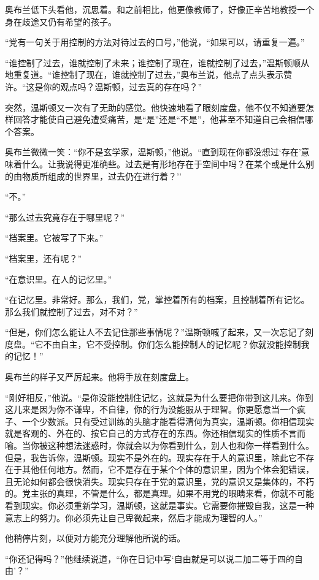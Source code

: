 奥布兰低下头看他，沉思着。和之前相比，他更像教师了，好像正辛苦地教授一个身在歧途又仍有希望的孩子。

``党有一句关于用控制的方法对待过去的口号，''他说，``如果可以，请重复一遍。''

``谁控制了过去，谁就控制了未来；谁控制了现在，谁就控制了过去，''温斯顿顺从地重复道。``谁控制了现在，谁就控制了过去，''奥布兰说，他点了点头表示赞许。``这是你的观点吗？温斯顿，过去真的存在吗？''

突然，温斯顿又一次有了无助的感觉。他快速地看了眼刻度盘，他不仅不知道要怎样回答才能使自己避免遭受痛苦，是``是''还是``不是''，他甚至不知道自己会相信哪个答案。

奥布兰微微一笑：``你不是玄学家，温斯顿，''他说。``直到现在你都没想过`存在'意味着什么。让我说得更准确些。过去是有形地存在于空间中吗？在某个或是什么别的由物质所组成的世界里，过去仍在进行着？''

``不。''

``那么过去究竟存在于哪里呢？''

``档案里。它被写了下来。''

``档案里，还有呢？''

``在意识里。在人的记忆里。''

``在记忆里。非常好。那么，我们，党，掌控着所有的档案，且控制着所有记忆。那么我们就控制了过去，对不对？''

``但是，你们怎么能让人不去记住那些事情呢？''温斯顿喊了起来，又一次忘记了刻度盘。``它不由自主，它不受控制。你们怎么能控制人的记忆呢？你就没能控制我的记忆！''

奥布兰的样子又严厉起来。他将手放在刻度盘上。

``刚好相反，''他说。``是你没能控制住记忆，这就是为什么要把你带到这儿来。你到这儿来是因为你不谦卑，不自律，你的行为没能服从于理智。你更愿意当一个疯子、一个少数派。只有受过训练的头脑才能看得清何为真实，温斯顿。你相信现实就是客观的、外在的、按它自己的方式存在的东西。你还相信现实的性质不言而喻。当你被这种想法迷惑时，你就会以为你看到什么，别人也和你一样看到什么。但是，我告诉你，温斯顿。现实不是外在的。现实存在于人的意识里，除此它不存在于其他任何地方。然而，它不是存在于某个个体的意识里，因为个体会犯错误，且无论如何都会很快消失。现实只存在于党的意识里，党的意识又是集体的，不朽的。党主张的真理，不管是什么，都是真理。如果不用党的眼睛来看，你就不可能看到现实。你必须重新学习，温斯顿，这就是事实。它需要你摧毁自我，这是一种意志上的努力。你必须先让自己卑微起来，然后才能成为理智的人。''

他稍停片刻，以便对方能充分理解他所说的话。

``你还记得吗？''他继续说道，``你在日记中写`自由就是可以说二加二等于四的自由'？''

